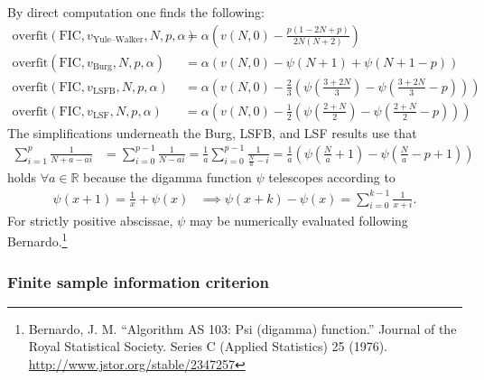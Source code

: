 \documentclass[12pt,letterpaper]{article}
\begin{document}
By direct computation one finds the following:
\begin{subequations}
\begin{align}
    \text{overfit}\!\left(\text{FIC},v_\text{Yule--Walker},N,p,\alpha\right)
    &=
    \alpha\left(
      v\!\left(N,0\right)
    - \frac{p \left(1-2 N+p\right)}{2 N \left(N+2\right)}
    \right)
\\
    \text{overfit}\!\left(\text{FIC},v_\text{Burg},N,p,\alpha\right)
    &=
    \alpha\left(
      v\!\left(N,0\right)
    - \psi\!\left(N+1\right)
    + \psi\!\left(N+1-p\right)
    \right)
\\
    \text{overfit}\!\left(\text{FIC},v_\text{LSFB},N,p,\alpha\right)
    &=
    \alpha\left(
      v\!\left(N,0\right)
    - \frac{2}{3} \left(
            \psi\!\left(\frac{3+2N}{3}\right)
          - \psi\!\left(\frac{3+2N}{3}-p\right)
      \right)
    \right)
\\
    \text{overfit}\!\left(\text{FIC},v_\text{LSF},N,p,\alpha\right)
    &=
    \alpha\left(
      v\!\left(N,0\right)
    - \frac{1}{2} \left(
            \psi\!\left(\frac{2+N}{2}\right)
          - \psi\!\left(\frac{2+N}{2}-p\right)
      \right)
    \right)
\end{align}
\end{subequations}
The simplifications underneath the Burg, LSFB, and LSF results use that
\begin{align}
    \sum_{i=1}^{p} \frac{1}{N+a-ai}
    &=
    \sum_{i=0}^{p-1} \frac{1}{N-ai}
    =
    \frac{1}{a} \sum_{i=0}^{p-1} \frac{1}{\frac{N}{a}-i}
    =
    \frac{1}{a} \left(
          \psi\!\left(\frac{N}{a}+1\right)
        - \psi\!\left(\frac{N}{a}-p+1\right)
    \right)
\end{align}
holds $\forall{}a\in\mathbb{R}$ because the digamma function $\psi$
telescopes according to
\begin{align}
    \psi\!\left(x+1\right)
    =
    \frac{1}{x}
    +
    \psi\!\left(x\right)
    &\implies
    \psi\!\left(x+k\right)
    -
    \psi\!\left(x\right)
    =
    \sum_{i=0}^{k-1} \frac{1}{x + i}
    .
\end{align}
For strictly positive abscissae, $\psi$ may be numerically evaluated following
Bernardo.\footnote{Bernardo, J. M.  ``Algorithm AS 103: Psi (digamma)
function.'' Journal of the Royal Statistical Society.  Series C (Applied
Statistics) 25 (1976).  \url{http://www.jstor.org/stable/2347257}}

\subsubsection*{Finite sample information criterion}
\end{document}
